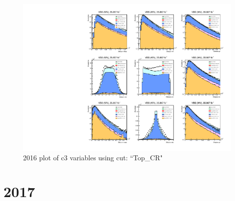 \documentclass{article}
\begin{document}
                    \begin{figure}[H]
                        \centering
                        \caption{2016 plot of c3 variables using cut: ``Top\_CR"}
                        \includegraphics[width=\textwidth]{2016/c3_2016_Top_CR.pdf}
                    \end{figure}    
    \section*{2017}
\end{document}
